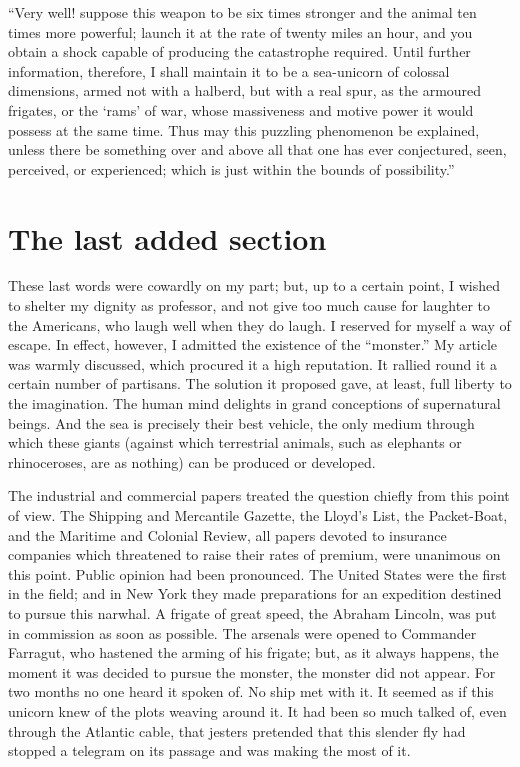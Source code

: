 ``Very well! suppose this weapon to be six times stronger and the animal
ten times more powerful; launch it at the rate of twenty miles an hour,
and you obtain a shock capable of producing the catastrophe required.
Until further information, therefore, I shall maintain it to be
a sea-unicorn of colossal dimensions, armed not with a halberd,
but with a real spur, as the armoured frigates, or the `rams' of war,
whose massiveness and motive power it would possess at the same time.
Thus may this puzzling phenomenon be explained, unless there be something over
and above all that one has ever conjectured, seen, perceived, or experienced;
which is just within the bounds of possibility.''

\section{The last added section}

These last words were cowardly on my part; but, up to a certain point,
I wished to shelter my dignity as professor, and not give
too much cause for laughter to the Americans, who laugh well
when they do laugh.  I reserved for myself a way of escape.
In effect, however, I admitted the existence of the ``monster.''
My article was warmly discussed, which procured it a high reputation.
It rallied round it a certain number of partisans.  The solution
it proposed gave, at least, full liberty to the imagination.
The human mind delights in grand conceptions of supernatural beings.
And the sea is precisely their best vehicle, the only medium
through which these giants (against which terrestrial animals,
such as elephants or rhinoceroses, are as nothing) can be produced
or developed.

The industrial and commercial papers treated the question chiefly from this
point of view.  The Shipping and Mercantile Gazette, the Lloyd's List,
the Packet-Boat, and the Maritime and Colonial Review, all papers devoted
to insurance companies which threatened to raise their rates of premium,
were unanimous on this point.  Public opinion had been pronounced.
The United States were the first in the field; and in New York they
made preparations for an expedition destined to pursue this narwhal.
A frigate of great speed, the Abraham Lincoln, was put in commission
as soon as possible.  The arsenals were opened to Commander Farragut,
who hastened the arming of his frigate; but, as it always happens,
the moment it was decided to pursue the monster, the monster did not appear.
For two months no one heard it spoken of.  No ship met with it.
It seemed as if this unicorn knew of the plots weaving around it.
It had been so much talked of, even through the Atlantic cable, that jesters
pretended that this slender fly had stopped a telegram on its passage and was
making the most of it.

